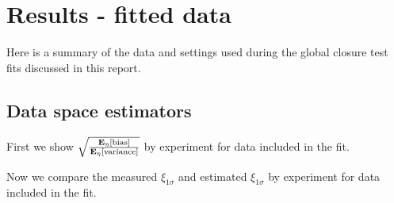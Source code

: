 \section{Results - fitted data}
\label{sec:ResultsFitted}

Here is a summary of the data and settings used during the global closure test
fits discussed in this report.



\subsection{Data space estimators}

First we show $\sqrt{\frac{\mathbf{E}_{\eta}\left[ {\rm bias} \right]}{\mathbf{E}_{\eta}\left[ {\rm variance} \right]}}$ by experiment
for data included in the fit.



Now we compare the measured $\xi_{1\sigma}$ and estimated $\xi_{1\sigma}$ by experiment
for data included in the fit.

